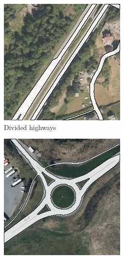\begin{figure}[h]
\begin{subfigure}{0.31\textwidth}
\includegraphics[width=\linewidth]{figs/datasets/nor_examples/1191_highway_vbase.png}
\caption{Divided highways} \label{fig:norwegian_roads_highway_vbase}
\end{subfigure}
\hspace*{\fill} %
\begin{subfigure}{0.31\textwidth}
\includegraphics[width=\linewidth]{figs/datasets/nor_examples/1177_roundabout_vbase.png}

\end{subfigure}
\end{figure}
